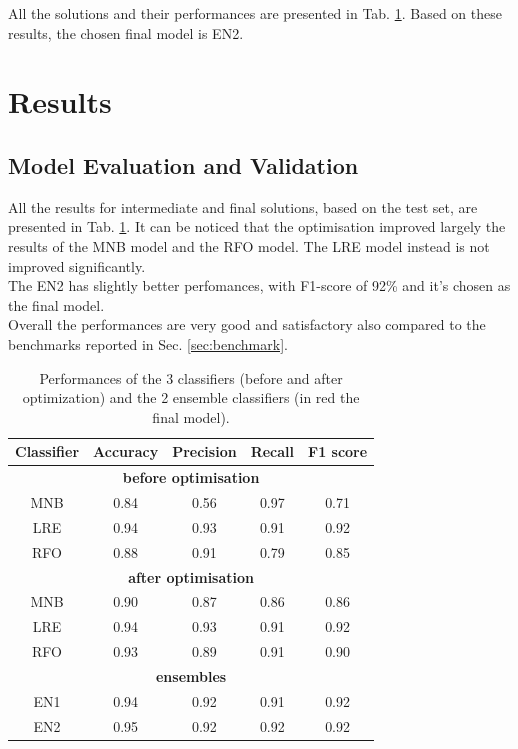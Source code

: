 \documentclass[a4paper,12pt]{article} %
\begin{document}
All the solutions and their performances are presented in Tab. \ref{tab:results}.
Based on these results, the chosen final model is EN2.


\section{Results}

\subsection{Model Evaluation and Validation}
All the results for intermediate and final solutions, based on the test set,
are presented in Tab. \ref{tab:results}.
It can be noticed that the optimisation improved largely the results
of the MNB model and the RFO model.
The LRE model instead is not improved significantly. \\
The EN2 has slightly better perfomances, with F1-score of 92\% and
it's chosen as the final model. \\
Overall the performances are very good and satisfactory also
compared to the benchmarks reported in Sec. \ref{sec:benchmark}.

\begin{table}
\begin{center}
\begin{tabular}{ c | c | c | c | c }
\textbf{Classifier} & \textbf{Accuracy} & \textbf{Precision} & \textbf{Recall} & \textbf{F1 score} \\ \hline
\multicolumn{5}{c}{\textbf{before optimisation}} \\ \hline
MNB & 0.84 & 0.56 & 0.97 & 0.71 \\ \hline
LRE & 0.94 & 0.93 & 0.91 & 0.92 \\ \hline
RFO & 0.88 & 0.91 & 0.79 & 0.85 \\ \hline
\multicolumn{5}{c}{\textbf{after optimisation}} \\ \hline
MNB & 0.90 & 0.87 & 0.86 & 0.86 \\ \hline
LRE & 0.94 & 0.93 & 0.91 & 0.92 \\ \hline
RFO & 0.93 & 0.89 & 0.91 & 0.90 \\ \hline
\multicolumn{5}{c}{\textbf{ensembles}} \\ \hline
EN1 & 0.94 & 0.92 & 0.91 & 0.92 \\ \hline
{\color{red} EN2} & {\color{red} 0.95} & {\color{red} 0.92} & {\color{red} 0.92} & {\color{red} 0.92} \\ \hline
\end{tabular}
\end{center}
\caption{Performances of the 3 classifiers (before and after optimization)
and the 2 ensemble classifiers (in red the final model).
\label{tab:results}}
\end{table}
\end{document}
